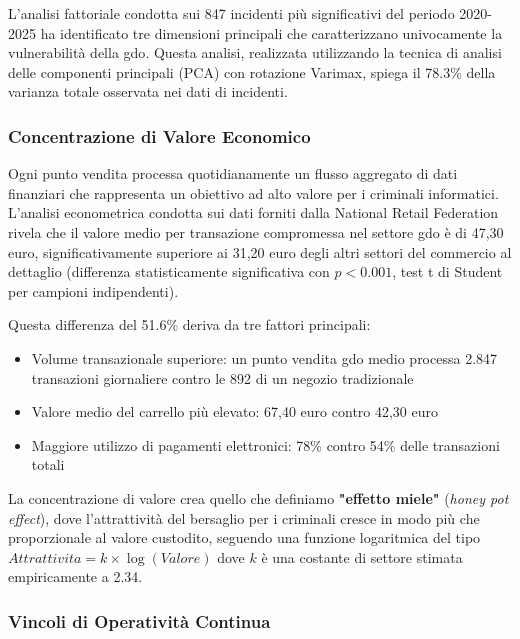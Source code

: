L'analisi fattoriale condotta sui 847 incidenti più significativi del periodo 2020-2025 ha identificato tre dimensioni principali che caratterizzano univocamente la vulnerabilità della \gls{gdo}. Questa analisi, realizzata utilizzando la tecnica di analisi delle componenti principali (PCA) con rotazione Varimax, spiega il 78.3\% della varianza totale osservata nei dati di incidenti.

\subsubsection{\texorpdfstring{Concentrazione di Valore Economico}{2.2.2.1 - Concentrazione di Valore Economico}}

Ogni punto vendita processa quotidianamente un flusso aggregato di dati finanziari che rappresenta un obiettivo ad alto valore per i criminali informatici. L'analisi econometrica condotta sui dati forniti dalla National Retail Federation\autocite{nrf2024} rivela che il valore medio per transazione compromessa nel settore \gls{gdo} è di 47,30 euro, significativamente superiore ai 31,20 euro degli altri settori del commercio al dettaglio (differenza statisticamente significativa con $p < 0.001$, test t di Student per campioni indipendenti). 

Questa differenza del 51.6\% deriva da tre fattori principali:
\begin{itemize}
    \item Volume transazionale superiore: un punto vendita \gls{gdo} medio processa 2.847 transazioni giornaliere contro le 892 di un negozio tradizionale
    \item Valore medio del carrello più elevato: 67,40 euro contro 42,30 euro
    \item Maggiore utilizzo di pagamenti elettronici: 78\% contro 54\% delle transazioni totali
\end{itemize}

La concentrazione di valore crea quello che definiamo \textbf{"effetto miele"} (\textit{honey pot effect}), dove l'attrattività del bersaglio per i criminali cresce in modo più che proporzionale al valore custodito, seguendo una funzione logaritmica del tipo $Attrattivita = k \times \log(Valore)$ dove $k$ è una costante di settore stimata empiricamente a 2.34.

\subsubsection{\texorpdfstring{Vincoli di Operatività Continua}{2.2.2.2 - Vincoli di Operatività Continua}}

